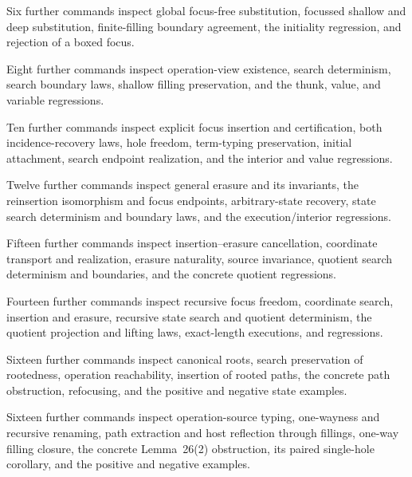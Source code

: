 Six further commands inspect global focus-free substitution, focussed shallow
and deep substitution, finite-filling boundary agreement, the initiality
regression, and rejection of a boxed focus.

Eight further commands inspect operation-view existence, search determinism,
search boundary laws, shallow filling preservation, and the thunk, value, and
variable regressions.

Ten further commands inspect explicit focus insertion and certification, both
incidence-recovery laws, hole freedom, term-typing preservation, initial
attachment, search endpoint realization, and the interior and value regressions.

Twelve further commands inspect general erasure and its invariants, the
reinsertion isomorphism and focus endpoints, arbitrary-state recovery, state
search determinism and boundary laws, and the execution/interior regressions.

Fifteen further commands inspect insertion--erasure cancellation, coordinate
transport and realization, erasure naturality, source invariance, quotient
search determinism and boundaries, and the concrete quotient regressions.

Fourteen further commands inspect recursive focus freedom, coordinate search,
insertion and erasure, recursive state search and quotient determinism, the
quotient projection and lifting laws, exact-length executions, and regressions.

Sixteen further commands inspect canonical roots, search preservation of
rootedness, operation reachability, insertion of rooted paths, the concrete
path obstruction, refocusing, and the positive and negative state examples.

Sixteen further commands inspect operation-source typing, one-wayness and
recursive renaming, path extraction and host reflection through fillings,
one-way filling closure, the concrete Lemma~26(2) obstruction, its paired
single-hole corollary, and the positive and negative examples.

